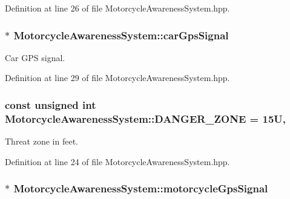 Definition at line 26 of file Motorcycle\-Awareness\-System.\-hpp.

\hypertarget{classMotorcycleAwarenessSystem_a9a8185e00b60d0be58bfa76166063128}{
\subsubsection[{car\-Gps\-Signal}]{$\ast$ Motorcycle\-Awareness\-System\-::car\-Gps\-Signal\hspace{0.3cm}{\ttfamily [private]}}}\label{classMotorcycleAwarenessSystem_a9a8185e00b60d0be58bfa76166063128}


Car G\-P\-S signal. 



Definition at line 29 of file Motorcycle\-Awareness\-System.\-hpp.

\hypertarget{classMotorcycleAwarenessSystem_abe0296f34c0ca2857a94659dfdc5801c}{
\subsubsection[{D\-A\-N\-G\-E\-R\-\_\-\-Z\-O\-N\-E}]{\setlength{\rightskip}{0pt plus 5cm}const unsigned int Motorcycle\-Awareness\-System\-::\-D\-A\-N\-G\-E\-R\-\_\-\-Z\-O\-N\-E = 15\-U\hspace{0.3cm}{\ttfamily [static]}, {\ttfamily [private]}}}\label{classMotorcycleAwarenessSystem_abe0296f34c0ca2857a94659dfdc5801c}


Threat zone in feet. 



Definition at line 24 of file Motorcycle\-Awareness\-System.\-hpp.

\hypertarget{classMotorcycleAwarenessSystem_ab281a3993b574923b2f379ed0477b2d4}{
\subsubsection[{motorcycle\-Gps\-Signal}]{$\ast$ Motorcycle\-Awareness\-System\-::motorcycle\-Gps\-Signal\hspace{0.3cm}{\ttfamily [private]}}}\label{classMotorcycleAwarenessSystem_ab281a3993b574923b2f379ed0477b2d4}


